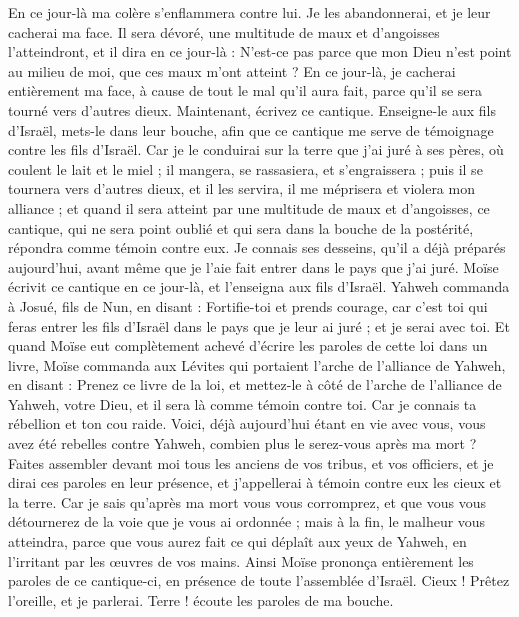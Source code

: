 \begin{multicols}{2}
En ce jour-là ma colère s'enflammera contre lui. Je les abandonnerai, et je leur cacherai ma face. Il sera dévoré, une multitude de maux et d'angoisses l'atteindront, et il dira en ce jour-là : N'est-ce pas parce que mon Dieu n'est point au milieu de moi, que ces maux m'ont atteint ?
En ce jour-là, je cacherai entièrement ma face, à cause de tout le mal qu'il aura fait, parce qu'il se sera tourné vers d'autres dieux.
Maintenant, écrivez ce cantique. Enseigne-le aux fils d'Israël, mets-le dans leur bouche, afin que ce cantique me serve de témoignage contre les fils d'Israël.
Car je le conduirai sur la terre que j'ai juré à ses pères, où coulent le lait et le miel ; il mangera, se rassasiera, et s'engraissera ; puis il se tournera vers d'autres dieux, et il les servira, il me méprisera et violera mon alliance ;
et quand il sera atteint par une multitude de maux et d'angoisses, ce cantique, qui ne sera point oublié et qui sera dans la bouche de la postérité, répondra comme témoin contre eux. Je connais ses desseins, qu'il a déjà préparés aujourd'hui, avant même que je l'aie fait entrer dans le pays que j'ai juré.
Moïse écrivit ce cantique en ce jour-là, et l'enseigna aux fils d'Israël.
Yahweh commanda à Josué, fils de Nun, en disant : Fortifie-toi et prends courage, car c'est toi qui feras entrer les fils d'Israël dans le pays que je leur ai juré ; et je serai avec toi.
Et quand Moïse eut complètement achevé d'écrire les paroles de cette loi dans un livre,
Moïse commanda aux Lévites qui portaient l'arche de l'alliance de Yahweh, en disant :
Prenez ce livre de la loi, et mettez-le à côté de l'arche de l'alliance de Yahweh, votre Dieu, et il sera là comme témoin contre toi.
Car je connais ta rébellion et ton cou raide. Voici, déjà aujourd'hui étant en vie avec vous, vous avez été rebelles contre Yahweh, combien plus le serez-vous après ma mort ?
Faites assembler devant moi tous les anciens de vos tribus, et vos officiers, et je dirai ces paroles en leur présence, et j'appellerai à témoin contre eux les cieux et la terre.
Car je sais qu'après ma mort vous vous corromprez, et que vous vous détournerez de la voie que je vous ai ordonnée ; mais à la fin, le malheur vous atteindra, parce que vous aurez fait ce qui déplaît aux yeux de Yahweh, en l'irritant par les œuvres de vos mains.
Ainsi Moïse prononça entièrement les paroles de ce cantique-ci, en présence de toute l'assemblée d'Israël.
\VerseOne{}Cieux ! Prêtez l'oreille, et je parlerai. Terre ! écoute les paroles de ma bouche.

\end{multicols}
